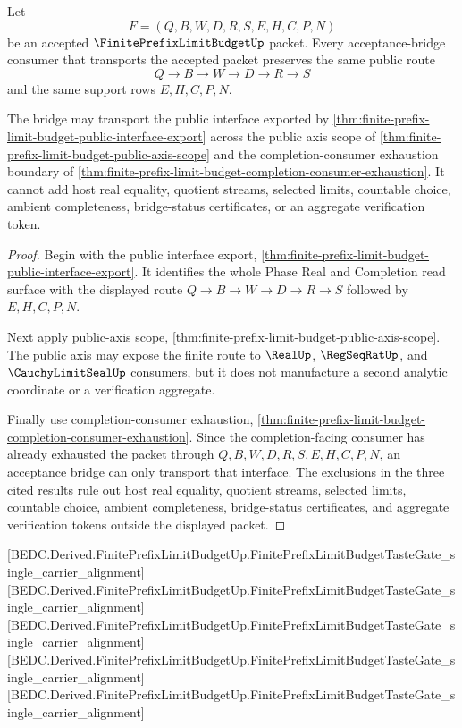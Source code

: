 \begin{theorem}
\label{thm:finite-prefix-limit-budget-acceptance-bridge-interface}
Let
$$
F=(Q,B,W,D,R,S,E,H,C,P,N)
$$
be an accepted $\FinitePrefixLimitBudgetUp$ packet. Every acceptance-bridge consumer that transports the accepted packet preserves the same public route
$$
Q \to B \to W \to D \to R \to S
$$
and the same support rows $E,H,C,P,N$.

The bridge may transport the public interface exported by \autoref{thm:finite-prefix-limit-budget-public-interface-export} across the public axis scope of \autoref{thm:finite-prefix-limit-budget-public-axis-scope} and the completion-consumer exhaustion boundary of \autoref{thm:finite-prefix-limit-budget-completion-consumer-exhaustion}. It cannot add host real equality, quotient streams, selected limits, countable choice, ambient completeness, bridge-status certificates, or an aggregate verification token.
\end{theorem}
\begin{proof}
Begin with the public interface export, \autoref{thm:finite-prefix-limit-budget-public-interface-export}. It identifies the whole Phase Real and Completion read surface with the displayed route $Q \to B \to W \to D \to R \to S$ followed by $E,H,C,P,N$.

Next apply public-axis scope, \autoref{thm:finite-prefix-limit-budget-public-axis-scope}. The public axis may expose the finite route to $\RealUp$, $\RegSeqRatUp$, and $\CauchyLimitSealUp$ consumers, but it does not manufacture a second analytic coordinate or a verification aggregate.

Finally use completion-consumer exhaustion, \autoref{thm:finite-prefix-limit-budget-completion-consumer-exhaustion}. Since the completion-facing consumer has already exhausted the packet through $Q,B,W,D,R,S,E,H,C,P,N$, an acceptance bridge can only transport that interface. The exclusions in the three cited results rule out host real equality, quotient streams, selected limits, countable choice, ambient completeness, bridge-status certificates, and aggregate verification tokens outside the displayed packet.
\end{proof}

[BEDC.Derived.FinitePrefixLimitBudgetUp.FinitePrefixLimitBudgetTasteGate\_single\_carrier\_alignment]
[BEDC.Derived.FinitePrefixLimitBudgetUp.FinitePrefixLimitBudgetTasteGate\_single\_carrier\_alignment]
[BEDC.Derived.FinitePrefixLimitBudgetUp.FinitePrefixLimitBudgetTasteGate\_single\_carrier\_alignment]
[BEDC.Derived.FinitePrefixLimitBudgetUp.FinitePrefixLimitBudgetTasteGate\_single\_carrier\_alignment]
[BEDC.Derived.FinitePrefixLimitBudgetUp.FinitePrefixLimitBudgetTasteGate\_single\_carrier\_alignment]

